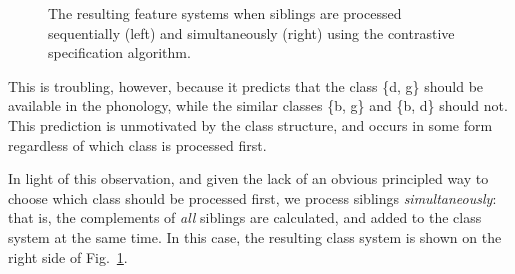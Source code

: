 \documentclass[11pt, oneside]{article}   	%
\begin{document}
\begin{figure}[h]
	\centering
	\qquad
	\caption{The resulting feature systems when siblings are processed sequentially (left) and simultaneously (right) using the contrastive specification algorithm.}
	\label{fig:siblingoutput}
\end{figure}


This is troubling, however, because it predicts that the class \{d, g\} should be available in the phonology, while the similar classes \{b, g\} and \{b, d\} should not. This prediction is unmotivated by the class structure, and occurs in some form regardless of which class is processed first.


In light of this observation, and given the lack of an obvious principled way to choose which class should be processed first, we process siblings \textit{simultaneously}: that is, the complements of \textit{all} siblings are calculated, and added to the class system at the same time. In this case, the resulting class system is shown on the right side of Fig.~\ref{fig:siblingoutput}.
\end{document}
